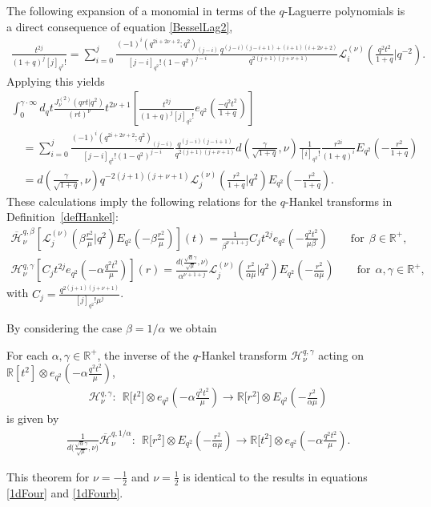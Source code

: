 \documentclass[pdftex]{sigma}
\newcommand{\mR}{\mathbb{R}}
\newcommand{\cH}{\mathcal{H}}
\newcommand{\cL}{\mathcal{L}}
\numberwithin{equation}{section}
\begin{document}
The following expansion of a monomial in terms of the $q$-Laguerre polynomials is a direct consequence of equation \eqref{BesselLag2},
\begin{gather*}
\frac{t^{2j}}{(1+q)^j[j]_{q^2}!}=\sum_{i=0}^j\frac{(-1)^i(q^{2i+2\nu+2};q^2)_{(j-i)}}{[j-i]_{q^2}!(1-q^2)^{j-i}}
\frac{q^{(j-i)(j-i+1)+(i+1)(i+2\nu+2)}}{q^{2(j+1)(j+\nu+1)}}\cL_i^{(\nu)}\left(\frac{q^2t^2}{1+q}|q^{-2}\right).
\end{gather*}
Applying this yields
\begin{gather*}
\int_0^{\gamma\cdot\infty}d_qt\frac{J_\nu^{(2)}(qrt|q^2)}{(rt)^{\nu}}t^{2\nu+1}
\left[\frac{t^{2j}}{(1+q)^j[j]_{q^2}!}e_{q^2}\left(\frac{-q^2t^2}{1+q}\right)\right]\\
\quad{}=\sum_{i=0}^j\frac{(-1)^i(q^{2i+2\nu+2};q^2)_{(j-i)}}{[j-i]_{q^2}!(1-q^2)^{j-i}}\frac{q^{(j-i)(j-i+1)}}{q^{2(j+1)(j+\nu+1)}}
d\left(\frac{\gamma}{\sqrt{1+q}},\nu\right)\frac{1}{[i]_{q^2}!}\frac{r^{2i}}{(1+q)^i}E_{q^2}\left(-\frac{r^2}{1+q}\right)\\
\quad{}=d\left(\frac{\gamma}{\sqrt{1+q}},\nu\right) q^{-2(j+1)(j+\nu+1)}\cL^{(\nu)}_j\left(\frac{r^2}{1+q}|q^2\right)E_{q^2}\left(-\frac{r^2}{1+q}\right).
\end{gather*}
These calculations imply the following relations for the $q$-Hankel transforms in Def\/inition~\ref{defHankel}:
\begin{gather*}
\overline{\cH}_{\nu}^{q,\beta}\left[\cL_j^{(\nu)}\left(\beta\frac{r^2}{\mu}|q^2\right)E_{q^2}\left(-\beta\frac{r^2}{\mu}\right)\right](t)=
\frac{1}{\beta^{\nu+1+j}}C_jt^{2j}e_{q^2}\left(-\frac{q^2t^2}{\mu\beta}\right)\qquad\mbox{for} \ \ \beta\in\mR^+,\\
\cH^{q,\gamma}_{\nu}\left[C_jt^{2j}e_{q^2}\left(-\alpha\frac{q^2t^2}{\mu}\right)\right](r)= \frac{d\big(\frac{\sqrt{\alpha}\gamma}{\sqrt{\mu}},\nu\big) }{\alpha^{\nu+1+j}}\cL^{(\nu)}_j\left(\frac{r^2}{\alpha\mu}|q^2\right)E_{q^2}\left(-\frac{r^2}{\alpha\mu}\right)\!\qquad\mbox{for} \ \ \alpha,\gamma\in\mR^+,
\end{gather*}
with $C_j=\frac{q^{2(j+1)(j+\nu+1)}}{[j]_{q^2}!\mu^j}$.


By considering the case $\beta=1/\alpha$ we obtain
\begin{theorem}
\label{Hankelinv}
For each $\alpha,\gamma\in\mR^+$, the inverse of the $q$-Hankel transform $\cH_\nu^{q,\gamma}$ acting on $\mR[t^2]\otimes e_{q^2}(-\alpha\frac{q^2t^2}{\mu})$,
\begin{gather*}
\cH_\nu^{q,\gamma}: \ \ \mR\big[t^2\big]\otimes e_{q^2}\left(-\alpha\frac{q^2t^2}{\mu}\right) \to\mR\big[r^2\big]\otimes E_{q^2}\left(-\frac{r^2}{\alpha\mu}\right)
\end{gather*}
is given by
\begin{gather*}
\frac{1}{d\big(\frac{\sqrt\alpha \gamma}{\sqrt\mu},\nu\big)}\overline{\cH}^{q,1/\alpha}_{\nu}: \ \ \mR\big[r^2\big]\otimes E_{q^2}\left(-\frac{r^2}{\alpha\mu}\right)\to \mR\big[t^2\big]\otimes e_{q^2}\left(-\alpha\frac{q^2t^2}{\mu}\right).
\end{gather*}
\end{theorem}
This theorem for $\nu=-\frac{1}{2}$ and $\nu=\frac{1}{2}$ is identical to the results in equations \eqref{1dFour} and \eqref{1dFourb}.
\end{document}
